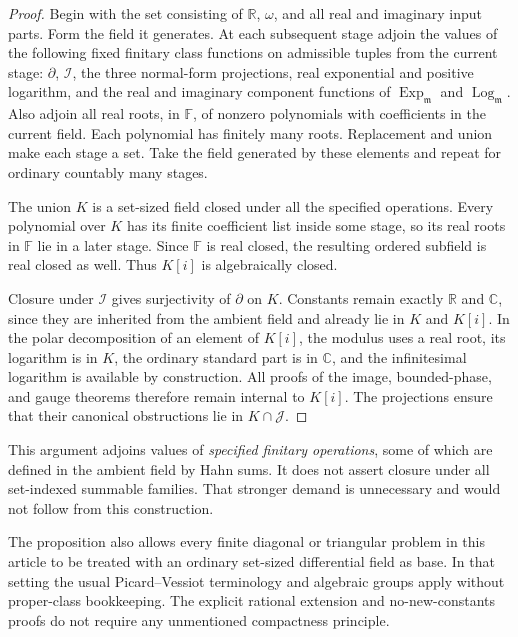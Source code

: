 \documentclass[11pt,a4paper]{article}
\numberwithin{equation}{section}
\theoremstyle{definition}
\theoremstyle{remark}
\newcommand{\F}{\mathbb F}
\newcommand{\R}{\mathbb R}
\newcommand{\C}{\mathbb C}
\newcommand{\mm}{\mathfrak m}
\newcommand{\J}{\mathcal J}
\newcommand{\D}{\partial}
\newcommand{\I}{\mathcal I}
\newcommand{\Ex}{\operatorname{Exp}_{\mm}}
\newcommand{\Lo}{\operatorname{Log}_{\mm}}
\begin{document}
\begin{proof}
Begin with the set consisting of $\R$, $\omega$, and all real and imaginary
input parts. Form the field it generates. At each subsequent stage adjoin
the values of the following fixed finitary class functions on admissible
tuples from the current stage: $\D$, $\I$, the three normal-form
projections, real exponential and positive logarithm, and the real and
imaginary component functions of $\Ex$ and $\Lo$. Also adjoin all real
roots, in $\F$, of nonzero polynomials with coefficients in the current
field. Each polynomial has finitely many roots. Replacement and union
make each stage a set. Take the field generated by these elements and
repeat for ordinary countably many stages.

The union $K$ is a set-sized field closed under all the specified
operations. Every polynomial over $K$ has its finite coefficient list
inside some stage, so its real roots in $\F$ lie in a later stage. Since
$\F$ is real closed, the resulting ordered subfield is real closed as
well. Thus $K[i]$ is algebraically closed.

Closure under $\I$ gives surjectivity of $\D$ on $K$. Constants remain
exactly $\R$ and $\C$, since they are inherited from the ambient field
and already lie in $K$ and $K[i]$. In the polar decomposition of an element
of $K[i]$, the modulus uses a real root, its logarithm is in $K$, the
ordinary standard part is in $\C$, and the infinitesimal logarithm is
available by construction. All proofs of the image, bounded-phase, and
gauge theorems therefore remain internal to $K[i]$. The projections ensure
that their canonical obstructions lie in $K\cap\J$.
\end{proof}

This argument adjoins values of \emph{specified finitary operations}, some
of which are defined in the ambient field by Hahn sums. It does not assert
closure under all set-indexed summable families. That stronger demand is
unnecessary and would not follow from this construction.

The proposition also allows every finite diagonal or triangular problem
in this article to be treated with an ordinary set-sized differential
field as base. In that setting the usual Picard--Vessiot terminology and
algebraic groups apply without proper-class bookkeeping. The explicit
rational extension and no-new-constants proofs do not require any
unmentioned compactness principle.
\end{document}
